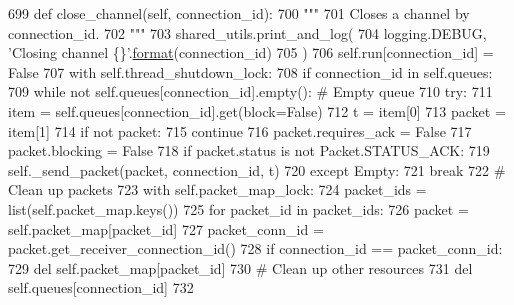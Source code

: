 \begin{DoxyCode}
699     \textcolor{keyword}{def }close\_channel(self, connection\_id):
700         \textcolor{stringliteral}{"""}
701 \textcolor{stringliteral}{        Closes a channel by connection\_id.}
702 \textcolor{stringliteral}{        """}
703         shared\_utils.print\_and\_log(
704             logging.DEBUG, \textcolor{stringliteral}{'Closing channel \{\}'}.\hyperlink{namespaceparlai_1_1chat__service_1_1services_1_1messenger_1_1shared__utils_a32e2e2022b824fbaf80c747160b52a76}{format}(connection\_id)
705         )
706         self.run[connection\_id] = \textcolor{keyword}{False}
707         with self.thread\_shutdown\_lock:
708             \textcolor{keywordflow}{if} connection\_id \textcolor{keywordflow}{in} self.queues:
709                 \textcolor{keywordflow}{while} \textcolor{keywordflow}{not} self.queues[connection\_id].empty():  \textcolor{comment}{# Empty queue}
710                     \textcolor{keywordflow}{try}:
711                         item = self.queues[connection\_id].get(block=\textcolor{keyword}{False})
712                         t = item[0]
713                         packet = item[1]
714                         \textcolor{keywordflow}{if} \textcolor{keywordflow}{not} packet:
715                             \textcolor{keywordflow}{continue}
716                         packet.requires\_ack = \textcolor{keyword}{False}
717                         packet.blocking = \textcolor{keyword}{False}
718                         \textcolor{keywordflow}{if} packet.status \textcolor{keywordflow}{is} \textcolor{keywordflow}{not} Packet.STATUS\_ACK:
719                             self.\_send\_packet(packet, connection\_id, t)
720                     \textcolor{keywordflow}{except} Empty:
721                         \textcolor{keywordflow}{break}
722                 \textcolor{comment}{# Clean up packets}
723                 with self.packet\_map\_lock:
724                     packet\_ids = list(self.packet\_map.keys())
725                     \textcolor{keywordflow}{for} packet\_id \textcolor{keywordflow}{in} packet\_ids:
726                         packet = self.packet\_map[packet\_id]
727                         packet\_conn\_id = packet.get\_receiver\_connection\_id()
728                         \textcolor{keywordflow}{if} connection\_id == packet\_conn\_id:
729                             del self.packet\_map[packet\_id]
730                 \textcolor{comment}{# Clean up other resources}
731                 del self.queues[connection\_id]
732 
\end{DoxyCode}
\mbox{\label{classparlai_1_1mturk_1_1core_1_1legacy__2018_1_1socket__manager_1_1SocketManager_a8fd31d452501b480aad260eebaf51c8e}} 
